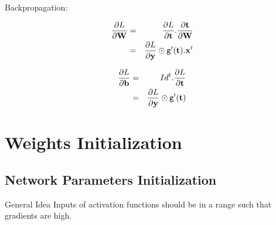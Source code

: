 \documentclass{book}
\newcommand{\x}{\mathbf{x}}
\newcommand{\y}{\mathbf{y}}
\newcommand{\W}{\mathbf{W}} %
\newcommand{\bias}{\mathbf{b}}%
\newcommand{\act}{\texttt{g}}%
\newcommand{\loss}{L}
\begin{document}
Backpropagation:
\begin{minipage}{.5\textwidth}
\begin{eqnarray*}
\pdv{\loss}{\W} &=& \pdv{\loss}{\mathbf{t}}.\pdv{\mathbf{t}}{\W} \\
&=& \pdv{\loss}{\y} \odot \act'(\mathbf{t}).\x^t
\end{eqnarray*}
\end{minipage}%
\begin{minipage}{.5\textwidth}
\begin{eqnarray*}
\pdv{\loss}{\bias} &=& Id^t . \pdv{\loss}{\mathbf{t}}\\
&=& \pdv{\loss}{\y} \odot \act'(\mathbf{t})
\end{eqnarray*}
\end{minipage}

\section{Weights Initialization}

\subsection{Network Parameters Initialization}

\begin{myblock}{General Idea}
Inputs of activation functions should be in a range such that gradients are high.
\end{myblock}
\end{document}
